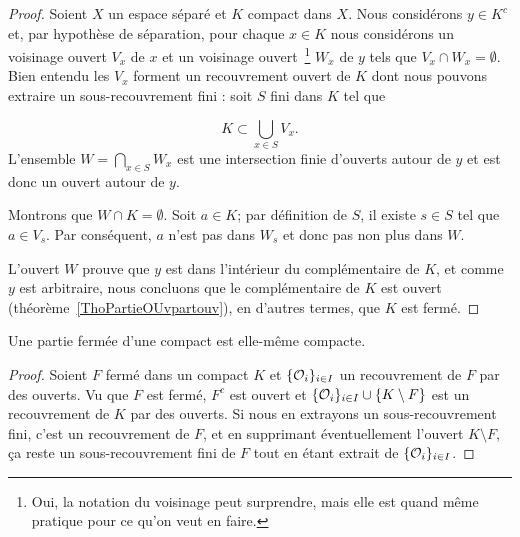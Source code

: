 \begin{proof}
    Soient \( X\) un espace séparé et \( K\) compact dans \( X\). Nous considérons \( y \in K^c\) et, par hypothèse de séparation, pour chaque \( x\in K\) nous considérons un voisinage ouvert \( V_x\) de \( x\) et un voisinage ouvert~\footnote{Oui, la notation du voisinage peut surprendre, mais elle est quand même pratique pour ce qu'on veut en faire.} \( W_x\) de \( y\) tels que \( V_x\cap W_x=\emptyset\). Bien entendu les \( V_x\) forment un recouvrement ouvert de \( K\) dont nous pouvons extraire un sous-recouvrement fini : soit \( S\) fini dans \( K\) tel que

    \begin{equation}
        K\subset\bigcup_{x\in S}V_x.
    \end{equation}
    L'ensemble \( W=\bigcap_{x\in S}W_x\) est une intersection finie d'ouverts autour de \( y\) et est donc un ouvert autour de \( y\). 
    
    Montrons que \( W\cap K=\emptyset\). Soit \( a\in K\); par définition de \( S\), il existe \( s\in S\) tel que \( a\in V_s\). Par conséquent, \( a\) n'est pas dans \( W_s\) et donc pas non plus dans \( W\).
    

    L'ouvert \( W\) prouve que \( y\) est dans l'intérieur du complémentaire de \( K\), et comme \( y \) est arbitraire, nous concluons que le complémentaire de \( K\) est ouvert (théorème~\ref{ThoPartieOUvpartouv}), en d'autres termes, que \( K\) est fermé.
\end{proof}

\begin{lemma}   \label{LemnAeACf}
    Une partie fermée d'une compact est elle-même compacte.
\end{lemma}

\begin{proof}

    Soient \( F\) fermé dans un compact \( K\) et \( \{ \mathcal{O}_i \}_{i\in I}\) un recouvrement de \( F\) par des ouverts. Vu que \( F\) est fermé, \( F^c\) est ouvert et \( \{ \mathcal{O}_i \}_{i\in I}\cup\{ K\setminus F \}\) est un recouvrement de \( K\) par des ouverts. Si nous en extrayons un sous-recouvrement fini, c'est un recouvrement de \( F\), et en supprimant éventuellement l'ouvert \( K\setminus F\), ça reste un sous-recouvrement fini de \( F\) tout en étant extrait de \( \{ \mathcal{O}_i \}_{i\in I}\).
\end{proof}

